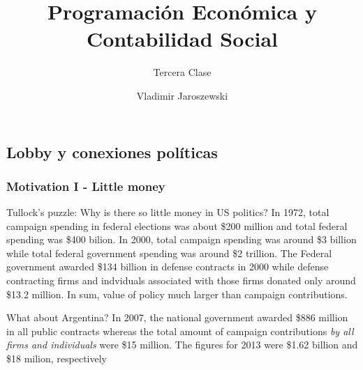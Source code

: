 \documentclass[
  ignorenonframetext,
]{beamer}
\title{Programación Económica y Contabilidad Social}
\subtitle{Tercera Clase}
\author{Vladimir Jaroszewski}
\date{}
\begin{document}
\frame{\titlepage}


\begin{frame}
\section{Lobby y conexiones políticas}

\begin{frame}\frametitle{Motivation I - Little money}
    \begin{itemize}\itemsep 10pt
      \begin{block}{Tullock's puzzle: Why is there so little money in
          US politics?}
In 1972, total campaign spending in federal elections was
about \$200 million and total federal spending was \$400 bilion. In
2000, total campaign spending was around \$3 billion while total
federal government spending was around \$2 trillion.  The Federal government awarded \$134 billion in defense
contracts in 2000 while defense contracting firms and indviduals associated with
those firms donated only around \$13.2 million. In sum, value
of policy much larger than campaign contributions. 
\end{block}
\begin{block}{What about Argentina?}
In 2007, the national government awarded \$886 million in all public
contracts whereas the total amount of campaign contributions
\textit{by all firms and individuals} were
\$15 million. The figures for 2013 were \$1.62 billion and \$18 milion, respectively
  \end{block}
    \end{itemize}
  \end{frame}
\end{frame}
\end{document}
